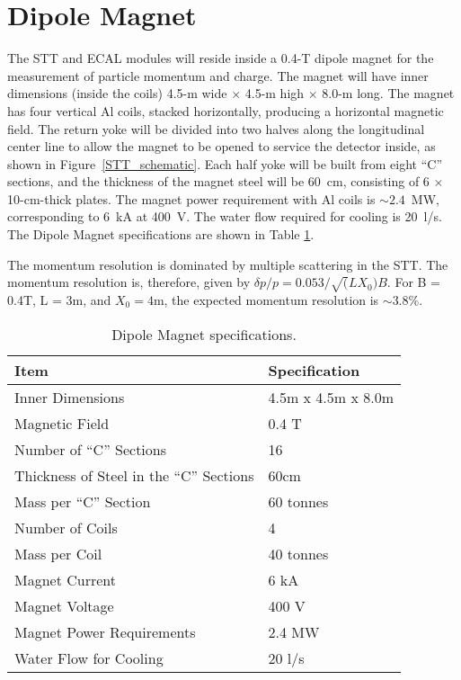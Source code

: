 \section{Dipole Magnet} 

The STT and ECAL modules will reside inside a 0.4-T dipole 
magnet for the measurement of particle momentum and charge. 
The magnet will have inner dimensions (inside the coils) 
4.5-m wide $\times$ 4.5-m high $\times$ 8.0-m long. The 
magnet 
has four vertical Al coils, stacked horizontally, producing a horizontal magnetic 
field. The return yoke will be divided into two halves along the 
longitudinal center line to allow the magnet to be opened to service the
detector inside, as shown in Figure~\ref{STT_schematic}. 
Each half yoke will be built
from eight ``C'' sections, and the thickness of the 
magnet steel will be 60~cm, consisting of 6
$\times$ 10-cm-thick plates. The magnet power requirement with Al coils is $\sim 2.4$~MW,
corresponding to 6~kA at 400~V. The water flow required for cooling is 20~l/s.
The Dipole Magnet specifications are shown in Table \ref{Magnet_specs}.

The momentum resolution is dominated by multiple scattering in the STT. The momentum resolution is, therefore, given by 
$\delta p/p = 0.053/\sqrt(LX_0)B$. For B = 0.4T, L = 3m, and $X_0 = 4$m, the
expected momentum resolution is $\sim 3.8\%$. 

\begin{table}
\centering
  \caption{\label{Magnet_specs} Dipole Magnet specifications.}
  \begin{tabular}{| l | l |}
    \hline
Item&Specification \\
    \hline
Inner Dimensions & 4.5m x 4.5m x 8.0m \\
Magnetic Field & 0.4 T \\
Number of ``C'' Sections & 16 \\
Thickness of Steel in the ``C'' Sections & 60cm \\
Mass per ``C'' Section & 60 tonnes \\
Number of Coils & 4 \\
Mass per Coil & 40 tonnes \\
Magnet Current & 6 kA \\
Magnet Voltage & 400 V \\
Magnet Power Requirements & 2.4 MW \\
Water Flow for Cooling & 20 l/s \\
     \hline
  \end{tabular}
\end{table}


